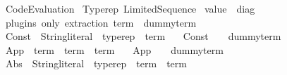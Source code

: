 %
\begin{isabellebody}%
%
%
\isadelimdocument
%
\endisadelimdocument
%
\isatagdocument
%
\isamarkuptrue%
%
\endisatagdocument
{\isafolddocument}%
%
\isadelimdocument
%
\endisadelimdocument
%
\isadelimtheory
%
\endisadelimtheory
%
\isatagtheory
{}\isamarkupfalse%
\ Code{\isacharunderscore}{\kern0pt}Evaluation\isanewline
{}\ Typerep\ Limited{\isacharunderscore}{\kern0pt}Sequence\isanewline
{}\ {\isachardoublequoteopen}value{\isachardoublequoteclose}\ {\isacharcolon}{\kern0pt}{\isacharcolon}{\kern0pt}\ diag\isanewline
{}%
\endisatagtheory
{\isafoldtheory}%
%
\isadelimtheory
%
\endisadelimtheory
%
\isadelimdocument
%
\endisadelimdocument
%
\isatagdocument
%
\isamarkuptrue%
%
\isamarkuptrue%
%
\endisatagdocument
{\isafolddocument}%
%
\isadelimdocument
%
\endisadelimdocument
{}\isamarkupfalse%
\ {\isacharparenleft}{\kern0pt}plugins\ only{\isacharcolon}{\kern0pt}\ extraction{\isacharparenright}{\kern0pt}\ {\isachardoublequoteopen}term{\isachardoublequoteclose}\ {\isacharequal}{\kern0pt}\ dummy{\isacharunderscore}{\kern0pt}term\isanewline
\isanewline
{}\isamarkupfalse%
\ Const\ {\isacharcolon}{\kern0pt}{\isacharcolon}{\kern0pt}\ {\isachardoublequoteopen}String{\isachardot}{\kern0pt}literal\ {\isasymRightarrow}\ typerep\ {\isasymRightarrow}\ term{\isachardoublequoteclose}\ \isanewline
\ \ {\isachardoublequoteopen}Const\ {\isacharunderscore}{\kern0pt}\ {\isacharunderscore}{\kern0pt}\ {\isacharequal}{\kern0pt}\ dummy{\isacharunderscore}{\kern0pt}term{\isachardoublequoteclose}\isanewline
\isanewline
{}\isamarkupfalse%
\ App\ {\isacharcolon}{\kern0pt}{\isacharcolon}{\kern0pt}\ {\isachardoublequoteopen}term\ {\isasymRightarrow}\ term\ {\isasymRightarrow}\ term{\isachardoublequoteclose}\ \isanewline
\ \ {\isachardoublequoteopen}App\ {\isacharunderscore}{\kern0pt}\ {\isacharunderscore}{\kern0pt}\ {\isacharequal}{\kern0pt}\ dummy{\isacharunderscore}{\kern0pt}term{\isachardoublequoteclose}\isanewline
\isanewline
{}\isamarkupfalse%
\ Abs\ {\isacharcolon}{\kern0pt}{\isacharcolon}{\kern0pt}\ {\isachardoublequoteopen}String{\isachardot}{\kern0pt}literal\ {\isasymRightarrow}\ typerep\ {\isasymRightarrow}\ term\ {\isasymRightarrow}\ term{\isachardoublequoteclose}\ \isanewline

\end{isabellebody}
